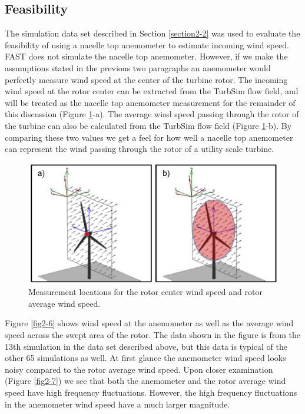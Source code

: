 \subsection{Feasibility} \label{section2-3-1} 

The simulation data set described in Section \ref{section2-2} was used to evaluate the feasibility of using a nacelle top anemometer to estimate incoming wind speed.  FAST does not simulate the nacelle top anemometer. However, if we make the assumptions stated in the previous two paragraphs an anemometer would perfectly measure wind speed at the center of the turbine rotor. The  incoming wind speed at the rotor center can be extracted from the TurbSim flow field, and will be treated as the nacelle top anemometer measurement for the remainder of this discussion (Figure \ref{fig2-4}-a). The average wind speed passing through the rotor of the turbine can also be calculated from the TurbSim flow field (Figure  \ref{fig2-4}-b). By comparing these two values we get a feel for how well a nacelle top anemometer can represent the wind passing through the rotor of a utility scale turbine.

\begin{figure}[htbp]
	\centering
		\includegraphics[width = \linewidth]{Figures/ch2Figures/fig2-4.jpg}
		
	\caption{Measurement locations for the rotor center wind speed and rotor average wind speed.}
	\label{fig2-4}
\end{figure}

Figure \ref{fig2-6} shows wind speed at the anemometer as well as the average wind speed across the swept area of the rotor. The data shown in the figure is from the 13th simulation in the data set described above, but this data is typical of the other 65 simulations as well. At first glance the anemometer wind speed looks noisy compared to the rotor average wind speed. Upon closer examination (Figure \ref{fig2-7}) we see that both the anemometer and the rotor average wind speed have high frequency fluctuations. However, the high frequency fluctuations in the anemometer wind speed have a much larger magnitude. 

